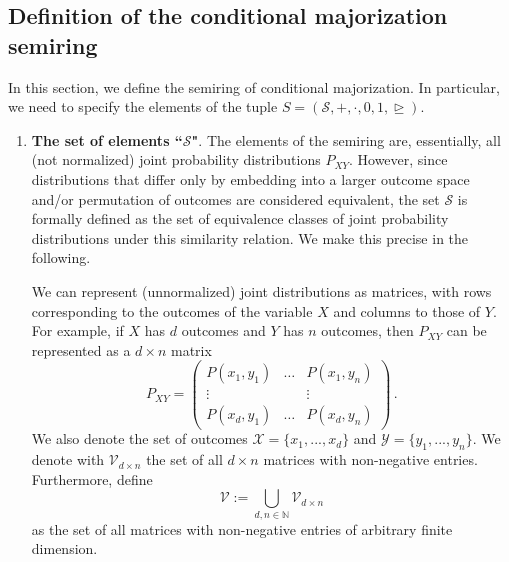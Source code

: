 \documentclass[aps,pra,11pt,onecolumn,nofootinbib,tightenlines]{revtex4-2}
\theoremstyle{definition}
\newcommand{\cS}{\mathcal{S}}
\newcommand{\X}{\mathcal{X}}
\newcommand{\Y}{\mathcal{Y}}
\newcommand{\rgeq}{\trianglerighteq}
\begin{document}
\subsection{Definition of the conditional majorization semiring}
In this section, we define the semiring of conditional majorization. In particular, we need to specify the elements of the tuple $S=(\mathcal{S}, +, \cdot, 0, 1, \rgeq)$.

\begin{enumerate}

\item \textbf{The set of elements ``$\cS$"}. The elements of the semiring are, essentially, all (not normalized) joint probability distributions $P_{XY}$.
However, since distributions that differ only by embedding into a larger outcome space and/or permutation of outcomes are considered equivalent, the set $\cS$ is formally defined as the set of equivalence classes of joint probability distributions under this similarity relation.
We make this precise in the following.

We can represent (unnormalized) joint distributions as matrices, with rows corresponding to the outcomes of the variable $X$ and columns to those of $Y$. For example, if $X$ has $d$ outcomes and $Y$ has $n$ outcomes, then $P_{XY}$ can be represented as a $d \times n$ matrix
\begin{equation}
P_{XY} = \begin{pmatrix}
P(x_1,y_1) & \hdots & P(x_1,y_n) \\
\vdots &  & \vdots \\
P(x_d,y_1) & \hdots & P(x_d,y_n)
\end{pmatrix} \,.
\end{equation}
We also denote the set of outcomes $\X=\{x_1,...,x_d\}$ and $\Y=\{y_1,...,y_n\}$.
We denote with $\mathcal{V}_{d \times n}$ the set of all $d \times n$ matrices with non-negative entries. Furthermore, define
\begin{equation}
    \mathcal{V} := \bigcup_{d,n \in \mathbb{N}} \mathcal{V}_{d \times n}
\end{equation}
as the set of all matrices with non-negative entries of arbitrary finite dimension.


\end{enumerate}
\end{document}

